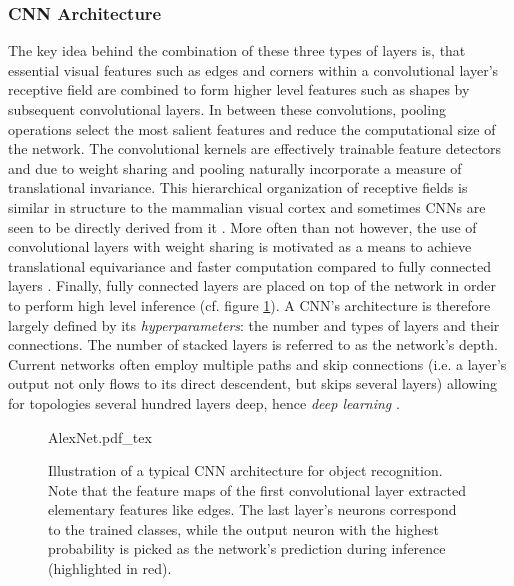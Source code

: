 \subsubsection{CNN Architecture}
The key idea behind the combination of these three types of layers is, that essential visual features such as edges and corners within a convolutional layer's receptive field are combined to form higher level features such as shapes by subsequent convolutional layers. In between these convolutions, pooling operations select the most salient features and reduce the computational size of the network. The convolutional kernels are effectively trainable feature detectors and due to weight sharing and pooling naturally incorporate a measure of translational invariance. This hierarchical organization of receptive fields is similar in structure to the mammalian visual cortex \cite{cat-brain} and sometimes CNNs are seen to be directly derived from it \cite{Fukushima1980,lecun2015deep}. More often than not however, the use of convolutional layers with weight sharing is motivated as a means to achieve translational equivariance and faster computation compared to fully connected layers \cite{Goodfellow-et-al-2016,7298668,7298594}. Finally, fully connected layers are placed on top of the network in order to perform high level inference (cf. figure \ref{fig:cnn-arch}). A CNN's architecture is therefore largely defined by its \emph{hyperparameters}: the number and types of layers and their connections. The number of stacked layers is referred to as the network's depth. Current networks often employ multiple paths and skip connections (i.e. a layer's output not only flows to its direct descendent, but skips several layers) allowing for topologies several hundred layers deep, hence \emph{deep learning} \cite{huang2017densely,szegedy2017inception,xie2017aggregated,wang2015towards}.
\begin{figure}
    \centering
\def\svgwidth{\textwidth}
{AlexNet.pdf_tex}
\caption[Illustration of a typical CNN architecture]{Illustration of a typical CNN architecture for object recognition. Note that the feature maps of the first convolutional layer extracted elementary features like edges. The last layer's neurons correspond to the trained classes, while the output neuron with the highest probability is picked as the network's prediction during inference (highlighted in red).}\label{fig:cnn-arch}
\end{figure}\noindent
